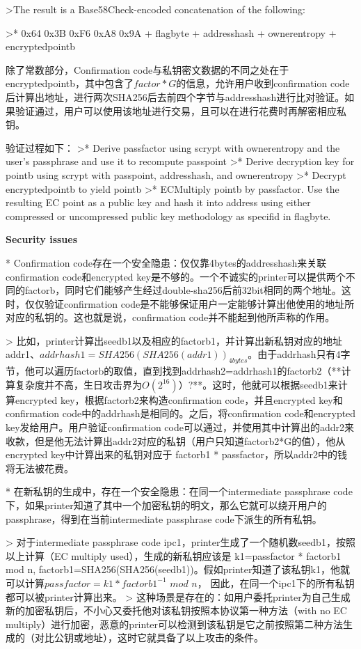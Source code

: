 \documentclass{article}
\begin{document}
>The result is a Base58Check-encoded concatenation of the following:  

>* 0x64 0x3B 0xF6 0xA8 0x9A + flagbyte + addresshash + ownerentropy + encryptedpointb

除了常数部分，Confirmation code与私钥密文数据的不同之处在于encryptedpointb，其中包含了$factor*G$的信息，允许用户收到confirmation code后计算出地址，进行两次SHA256后去前四个字节与addresshash进行比对验证。如果验证通过，用户可以使用该地址进行交易，且可以在进行花费时再解密相应私钥。

验证过程如下：
>* Derive passfactor using scrypt with ownerentropy and the user's passphrase and use it to recompute passpoint
>* Derive decryption key for pointb using scrypt with passpoint, addresshash, and ownerentropy
>* Decrypt encryptedpointb to yield pointb
>* ECMultiply pointb by passfactor. Use the resulting EC point as a public key and hash it into address using either compressed or 
uncompressed public key methodology as specifid in flagbyte.

\textbf{ Security issues}

* Confirmation code存在一个安全隐患：仅仅靠4bytes的addresshash来关联confirmation code和encrypted key是不够的。一个不诚实的printer可以提供两个不同的factorb，同时它们能够产生经过double-sha256后前32bit相同的两个地址。这时，仅仅验证confirmation code是不能够保证用户一定能够计算出他使用的地址所对应的私钥的。这也就是说，confirmation code并不能起到他所声称的作用。

> 比如，printer计算出seedb1以及相应的factorb1，并计算出新私钥对应的地址addr1、$addrhash1=SHA256(SHA256(addr1))_{4bytes}$。由于addrhash只有4字节，他可以遍历factorb的取值，直到找到addrhash2=addrhash1的factorb2（**计算复杂度并不高，生日攻击界为$O(2^{16})$）?**。这时，他就可以根据seedb1来计算encrypted key，根据factorb2来构造confirmation code，并且encrypted key和confirmation code中的addrhash是相同的。之后，将confirmation code和encrypted key发给用户。用户验证confirmation code可以通过，并使用其中计算出的addr2来收款，但是他无法计算出addr2对应的私钥（用户只知道factorb2*G的值），他从encrypted key中计算出来的私钥对应于 factorb1 * passfactor，所以addr2中的钱将无法被花费。

* 在新私钥的生成中，存在一个安全隐患：在同一个intermediate passphrase code下，如果printer知道了其中一个加密私钥的明文，那么它就可以绕开用户的passphrase，得到在当前intermediate passphrase code下派生的所有私钥。
  
> 对于intermediate passphrase code ipc1，printer生成了一个随机数seedb1，按照以上计算（EC multiply used），生成的新私钥应该是 k1=passfactor * factorb1 mod n, factorb1=SHA256(SHA256(seedb1))。假如printer知道了该私钥k1，他就可以计算$passfactor=k1 * factorb1^{-1}$ $mod$ $n$， 因此，在同一个ipc1下的所有私钥都可以被printer计算出来。  
> 这种场景是存在的：如用户委托printer为自己生成新的加密私钥后，不小心又委托他对该私钥按照本协议第一种方法（with no EC multiply）进行加密，恶意的printer可以检测到该私钥是它之前按照第二种方法生成的（对比公钥或地址），这时它就具备了以上攻击的条件。
\end{document}
